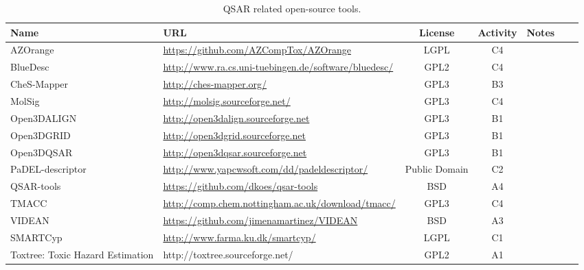 \begin{table} 
    \begin{tabular}{ l l c c c c c }
    Name & URL & License & Activity & Notes \\ \hline
        AZOrange & \url{https://github.com/AZCompTox/AZOrange} & LGPL & C4 & \cite{St_lring_2011}\\ 
        BlueDesc & \url{http://www.ra.cs.uni-tuebingen.de/software/bluedesc/} & GPL2 & C4 & \\ 
        CheS-Mapper &  \url{http://ches-mapper.org/} & GPL3 & B3 & \cite{G_tlein_2014} \\ 
        MolSig & \url{http://molsig.sourceforge.net/} & GPL3 & C4 & \cite{Carbonell_2013}\\ 
        Open3DALIGN &  \url{http://open3dalign.sourceforge.net} & GPL3 & B1 & \cite{Tosco_2011}\\ 
        Open3DGRID &  \url{http://open3dgrid.sourceforge.net} & GPL3 & B1 & \\ 
        Open3DQSAR &  \url{http://open3dqsar.sourceforge.net} & GPL3 & B1 & \cite{Tosco_2010}\\ 
        PaDEL-descriptor &  \url{http://www.yapcwsoft.com/dd/padeldescriptor/} & Public Domain & C2 & \cite{Yap_2010} \\ 
        QSAR-tools &  \url{https://github.com/dkoes/qsar-tools} & BSD & A4 & \\ 
        TMACC &  \url{http://comp.chem.nottingham.ac.uk/download/tmacc/} & GPL3 & C4 & \cite{Melville_2007} \\ 
        VIDEAN &  \url{https://github.com/jimenamartinez/VIDEAN} & BSD & A3 & \cite{Mart_nez_2015} \\ 
        SMARTCyp &  \url{http://www.farma.ku.dk/smartcyp/} & LGPL & C1 & \cite{Rydberg_2013}\cite{Rydberg_2012} \\ 
        Toxtree: Toxic Hazard Estimation &  http://toxtree.sourceforge.net/ & GPL2 & A1 & \cite{Patlewicz_2008} \\ 
    \end{tabular} 
    \caption{\label{qsartable} QSAR related open-source tools.}
\end{table}